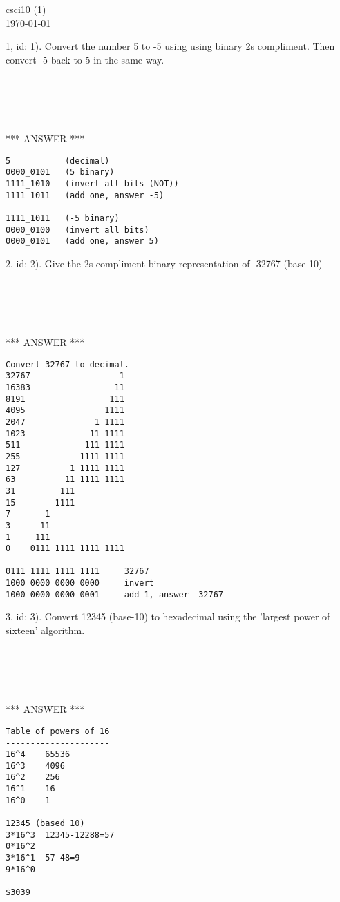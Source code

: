 \documentclass[fleqn]{article}
\begin{document}
\begin{flushleft}
csci10 (1)\\
\today
\end{flushleft}


1, id: 1).  Convert the number 5 to -5 using using binary 2s compliment.
Then convert -5 back to 5 in the same way.
\begin{verbatim}





\end{verbatim}

*** ANSWER ***

\begin{verbatim}
5 			(decimal)
0000_0101   (5 binary)
1111_1010	(invert all bits (NOT))
1111_1011	(add one, answer -5)

1111_1011   (-5 binary)
0000_0100   (invert all bits)
0000_0101   (add one, answer 5)
\end{verbatim}

2, id: 2).  Give the 2s compliment binary representation of -32767 (base 10)
\begin{verbatim}





\end{verbatim}

*** ANSWER ***

\begin{verbatim}
Convert 32767 to decimal.
32767				   1
16383		   	      11
8191		  	     111
4095		 	    1111
2047	   	      1 1111
1023      	     11 1111
511      	    111 1111
255     	   1111 1111
127   	     1 1111 1111
63	        11 1111 1111
31         111
15        1111
7       1
3      11
1  	  111
0 	 0111 1111 1111 1111

0111 1111 1111 1111		32767
1000 0000 0000 0000		invert
1000 0000 0000 0001		add 1, answer -32767
\end{verbatim}

3, id: 3).  Convert 12345 (base-10) to hexadecimal using the 'largest power of sixteen' algorithm.
\begin{verbatim}





\end{verbatim}

*** ANSWER ***

\begin{verbatim}
Table of powers of 16
---------------------
16^4	65536
16^3	4096
16^2	256
16^1	16
16^0	1

12345 (based 10)
3*16^3	12345-12288=57
0*16^2
3*16^1	57-48=9
9*16^0  

$3039
\end{verbatim}
\end{document}
